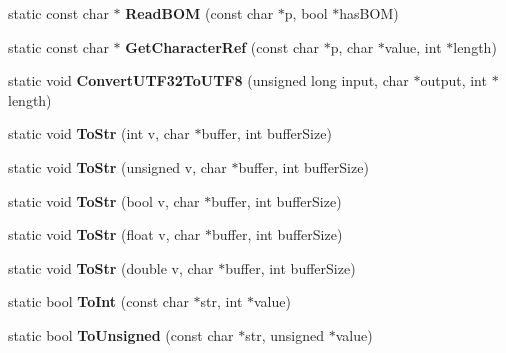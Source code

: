 \begin{DoxyCompactItemize}
static const char $\ast$ {\bfseries Read\+B\+OM} (const char $\ast$p, bool $\ast$has\+B\+OM)
\item 
\mbox{\label{classtinyxml2_1_1XMLUtil_a5a96e5144a8d693dc4bcd783d9964648}} 
static const char $\ast$ {\bfseries Get\+Character\+Ref} (const char $\ast$p, char $\ast$value, int $\ast$length)
\item 
\mbox{\label{classtinyxml2_1_1XMLUtil_a31c00d5c5dfb38382de1dfcaf4be3595}} 
static void {\bfseries Convert\+U\+T\+F32\+To\+U\+T\+F8} (unsigned long input, char $\ast$output, int $\ast$length)
\item 
\mbox{\label{classtinyxml2_1_1XMLUtil_a3cd6c703d49b9d51bdf0f4ff6aa021c7}} 
static void {\bfseries To\+Str} (int v, char $\ast$buffer, int buffer\+Size)
\item 
\mbox{\label{classtinyxml2_1_1XMLUtil_ac00c2e52c1c36dab3ff41d86a9bf60f9}} 
static void {\bfseries To\+Str} (unsigned v, char $\ast$buffer, int buffer\+Size)
\item 
\mbox{\label{classtinyxml2_1_1XMLUtil_adba0718527ae9e80f663a71ea325cb11}} 
static void {\bfseries To\+Str} (bool v, char $\ast$buffer, int buffer\+Size)
\item 
\mbox{\label{classtinyxml2_1_1XMLUtil_a8957ad44fee5fa02ba52d73aad4d0a31}} 
static void {\bfseries To\+Str} (float v, char $\ast$buffer, int buffer\+Size)
\item 
\mbox{\label{classtinyxml2_1_1XMLUtil_a1cd141e50980fcddd6bf9af5de4b1db7}} 
static void {\bfseries To\+Str} (double v, char $\ast$buffer, int buffer\+Size)
\item 
\mbox{\label{classtinyxml2_1_1XMLUtil_ad4df4023d11ee3fca9689c49b9707323}} 
static bool {\bfseries To\+Int} (const char $\ast$str, int $\ast$value)
\item 
\mbox{\label{classtinyxml2_1_1XMLUtil_a210c8637d5eb4ce3d4625294af0efc2f}} 
static bool {\bfseries To\+Unsigned} (const char $\ast$str, unsigned $\ast$value)

\end{DoxyCompactItemize}
